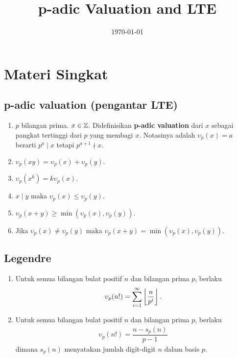 \documentclass[12pt]{scrartcl}
\title{p-adic Valuation and LTE}
\date{\today}
\begin{document}
\maketitle

\renewcommand*\contentsname{Daftar Isi}
\tableofcontents

\newpage

\section{Materi Singkat}
\subsection{p-adic valuation (pengantar LTE)}
\begin{enumerate}
    \item $p$ bilangan prima. $x \in \mathbb Z$. Didefinisikan \textbf{p-adic valuation} dari $x$ sebagai pangkat tertinggi dari $p$ yang membagi $x$. Notasinya adalah $\upsilon_p(x)=a$ berarti $p^a \mid x$ tetapi $p^{a+1} \nmid x$.
    \item $\upsilon_p(xy) = \upsilon_p(x) + \upsilon_p(y)$.
    \item $\upsilon_p(x^k)=k\upsilon_p(x)$.
    \item $x \mid y$ maka $\upsilon_p(x) \le \upsilon_p(y)$.
    \item $\upsilon_p(x+y) \ge \min(\upsilon_p(x),\upsilon_p(y))$.
    \item Jika $\upsilon_p(x) \neq \upsilon_p(y)$ maka $\upsilon_p(x+y) = \min(\upsilon_p(x),\upsilon_p(y))$.
\end{enumerate}

\subsection{Legendre}
\begin{enumerate}
    \item Untuk semua bilangan bulat positif $n$ dan bilangan prima $p$, berlaku
\begin{align*}
    \upsilon_p(n!) = \sum_{i=1}^{\infty} \left\lfloor \frac{n}{p^i} \right\rfloor.
\end{align*}

    \item Untuk semua bilangan bulat positif $n$ dan bilangan prima $p$, berlaku
\begin{align*}
    \upsilon_p(n!) = \dfrac{n-s_p(n)}{p-1}
\end{align*}
    dimana $s_p(n)$ menyatakan jumlah digit-digit $n$ dalam basis $p$.
\end{enumerate}
\end{document}
